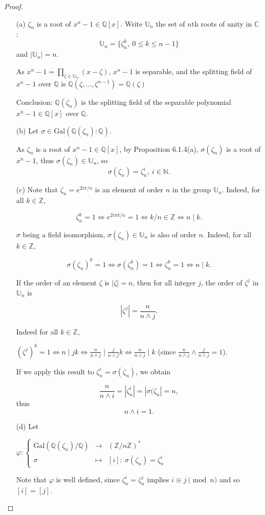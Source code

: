 \documentclass[11pt,a4paper]{article}
\newcommand{\Q}{\mathbb{Q}}
\newcommand{\Z}{\mathbb{Z}}
\newcommand{\N}{\mathbb{N}}
\newcommand{\C}{\mathbb{C}}
\newcommand{\U}{\mathbb{U}}
\newcommand{\Gal}{\mathrm{Gal}}
\begin{document}
\begin{proof}
\begin{enumerate}
\item[(a)]
 $\zeta_n$ is a root of $x^n-1\in \Q[x]$. Write $\U_n$ the set of $n$th  roots of unity in $\C$ : $$\U_n = \{\zeta_n^k,\  0\leq k \leq n-1\}$$ and $|\U_n| = n$.

As $x^n-1 = \prod\limits_{\zeta \in \U_n}(x-\zeta)$, $x^n-1$ is separable, and the splitting field of $x^n-1$ over $\Q$ is 
$\Q(\zeta,\ldots, \zeta^{n-1}) = \Q(\zeta)$

Conclusion: $\Q(\zeta_n)$ is the splitting field of the separable polynomial $x^n-1\in \Q[x]$ over $\Q$.

\item[(b)]
Let $\sigma \in \Gal(\Q(\zeta_n):\Q)$.

As $\zeta_n$ is a root of $x^n - 1 \in \Q[x]$, by Proposition 6.1.4(a), $\sigma(\zeta_n) $ is a root of $x^n-1$, thus  $\sigma(\zeta_n)  \in \U_n$, so
$$\sigma(\zeta_n) = \zeta_n^i,\  i \in \N.$$

\item[(c)] Note that $\zeta_n = e^{2i\pi/n}$ is an element of order $n$ in the group $\U_n$. Indeed, for all $k\in \Z$,

$$\zeta_n^k = 1     \iff e^{2i\pi k /n} = 1 \iff k/n \in \Z \iff n\mid k.$$   

$\sigma$ being a field isomorphism, $\sigma(\zeta_n) \in \U_n$ is also of order $n$. Indeed, for all $k\in \Z$,

$$\sigma(\zeta_n) ^k=1 \iff \sigma(\zeta_n^k)=1 \iff \zeta_n^k = 1 \iff n \mid k.$$

If the order of an element $\zeta $ is $| \zeta| =n$, then for all integer $j$,  the order of $\zeta^j$ in  $\U_n$ is

$$|\zeta^j |= \frac{n}{n\wedge j}.$$

Indeed for all $k\in \Z$, 

$(\zeta^j)^k = 1 \iff n \mid jk \iff \frac{n}{n\wedge j} \mid \frac{j}{n\wedge j} k \iff \frac{n}{n\wedge j} \mid k$ (since $\frac{n}{n\wedge j} \wedge \frac{j}{n\wedge j}=1$).

If we apply this result to $\zeta_n^i =\sigma(\zeta_n)$, we obtain

  $$\frac{n}{n\wedge i} = | \zeta_n^i |= | \sigma(\zeta_n |= n,$$ thus $$n\wedge i = 1.$$
                                                 
\item[(d)]
Let
\begin{center}
$
\varphi : 
\left\{
\begin{array}{ccc}
 \Gal(\Q(\zeta_n)/\Q) &  \to  & ( \Z/n\Z)^* \\
  \sigma &  \mapsto  &  [i] : \ \sigma(\zeta_n) = \zeta_n^i
\end{array}
\right.
$
\end{center}
Note that $\varphi$ is well defined, since $\zeta_n^i = \zeta_n^j$ implies $i\equiv j \pmod n$ and so $[i] = [j]$.


\end{enumerate}
\end{proof}
\end{document}
